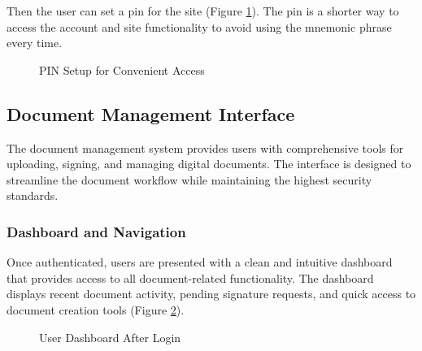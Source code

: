 Then the user can set a pin for the site (Figure \ref{pin-for-site}). The pin is a shorter way to access the account and site functionality to avoid using the mnemonic phrase every time. 

\begin{figure}[H]
    \centering
    \caption{PIN Setup for Convenient Access}
    \label{pin-for-site}
\end{figure}

\subsection{Document Management Interface}
The document management system provides users with comprehensive tools for uploading, signing, and managing digital documents. The interface is designed to streamline the document workflow while maintaining the highest security standards.

\subsubsection{Dashboard and Navigation}
Once authenticated, users are presented with a clean and intuitive dashboard that provides access to all document-related functionality. The dashboard displays recent document activity, pending signature requests, and quick access to document creation tools (Figure \ref{logged-in-dashboard}).

\begin{figure}[H]
    \centering
    \caption{User Dashboard After Login}
    \label{logged-in-dashboard}
\end{figure}

